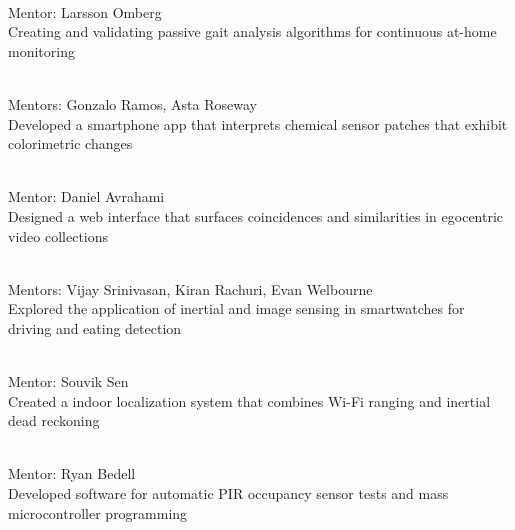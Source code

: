  \\
Mentor: Larsson Omberg \\
Creating and validating passive gait analysis algorithms for continuous at-home monitoring
\vspace{5pt}

 \\
Mentors: Gonzalo Ramos, Asta Roseway \\
Developed a smartphone app that interprets chemical sensor patches that exhibit colorimetric changes
\vspace{5pt}

 \\
Mentor: Daniel Avrahami \\
Designed a web interface that surfaces coincidences and similarities in egocentric video collections
\vspace{5pt}

 \\
Mentors: Vijay Srinivasan, Kiran Rachuri, Evan Welbourne \\
Explored the application of inertial and image sensing in smartwatches for driving and eating detection
\vspace{5pt}

 \\
Mentor: Souvik Sen \\
Created a indoor localization system that combines Wi-Fi ranging and inertial dead reckoning
\vspace{5pt}

 \\
Mentor: Ryan Bedell \\
Developed software for automatic PIR occupancy sensor tests and mass microcontroller programming